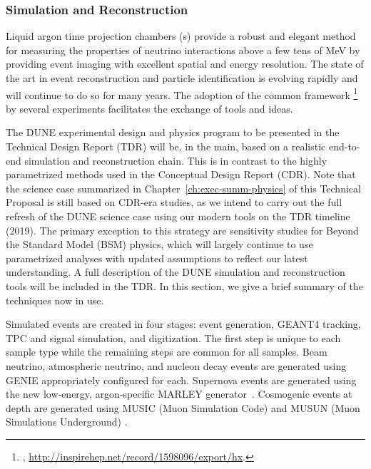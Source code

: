 \subsubsection{Simulation and Reconstruction}
\label{sec:exec-summ-strat-simreco}

Liquid argon time projection chambers (\lartpc{}s) provide a robust and elegant method for measuring the properties of neutrino interactions above a few tens of MeV by providing \threed event imaging with excellent spatial and energy resolution.  The state of the art in \lartpc event reconstruction and particle identification is evolving rapidly and will continue to do so for many years.  The adoption of the common framework \larsoft{}\footnote{\larsoft, \url{http://inspirehep.net/record/1598096/export/hx}.} by several \lartpc experiments facilitates the exchange of tools and ideas.

The DUNE experimental design and physics program to be presented in the Technical Design Report (TDR) will be, in the main, based on a realistic end-to-end simulation and reconstruction chain.  This is in contrast to the highly parametrized methods used in the Conceptual Design Report (CDR).  Note that the science case summarized in Chapter~\ref{ch:exec-summ-physics} of this Technical Proposal is still based on CDR-era studies, as we intend to carry out the full refresh of the DUNE science case using our modern tools on the TDR timeline (2019).  The primary exception to this strategy are sensitivity studies for Beyond the Standard Model (BSM) physics, which will largely continue to use parametrized analyses with updated assumptions to reflect our latest understanding.  A full description of the DUNE simulation and reconstruction tools will be included in the TDR.  In this section, we give a brief summary of the techniques now in use.

Simulated events are created in four stages: event generation, {\sc GEANT4} tracking, TPC and  signal simulation, and digitization.  The first step is unique to each sample type while the remaining steps are common for all samples. Beam neutrino, atmospheric neutrino, and nucleon decay events are generated using {\sc GENIE} appropriately configured for each.  Supernova events are generated using the new low-energy, argon-specific MARLEY generator~\cite{marley}.  Cosmogenic events at depth are generated using MUSIC (Muon Simulation Code) \cite{MUSICPaper} and MUSUN (Muon Simulations Underground) \cite{Kudryavtsev:musun}.

